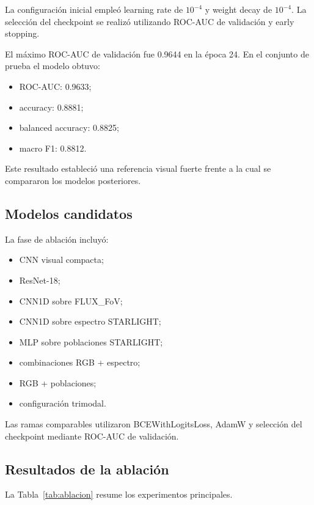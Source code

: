 \documentclass[letterpaper,11pt]{article}
\begin{document}
La configuración inicial empleó learning rate de $10^{-4}$ y weight decay de $10^{-4}$. La selección del checkpoint se realizó utilizando ROC-AUC de validación y early stopping. 

El máximo ROC-AUC de validación fue 0.9644 en la época 24. En el conjunto de prueba el modelo obtuvo:

\begin{itemize} 
  \item ROC-AUC: 0.9633; 
  \item accuracy: 0.8881; 
  \item balanced accuracy: 0.8825; 
  \item macro F1: 0.8812. 
\end{itemize}

Este resultado estableció una referencia visual fuerte frente a la cual se compararon los modelos posteriores. 

\subsection{Modelos candidatos} 

La fase de ablación incluyó:

\begin{itemize} 
  \item CNN visual compacta; 
  \item ResNet-18; 
  \item CNN1D sobre FLUX\_FoV; 
  \item CNN1D sobre espectro STARLIGHT; 
  \item MLP sobre poblaciones STARLIGHT; 
  \item combinaciones RGB + espectro; 
  \item RGB + poblaciones; 
  \item configuración trimodal. 
\end{itemize}

Las ramas comparables utilizaron BCEWithLogitsLoss, AdamW y selección del checkpoint mediante ROC-AUC de validación. 

\subsection{Resultados de la ablación} 

La Tabla~\ref{tab:ablacion} resume los experimentos principales.
\end{document}
